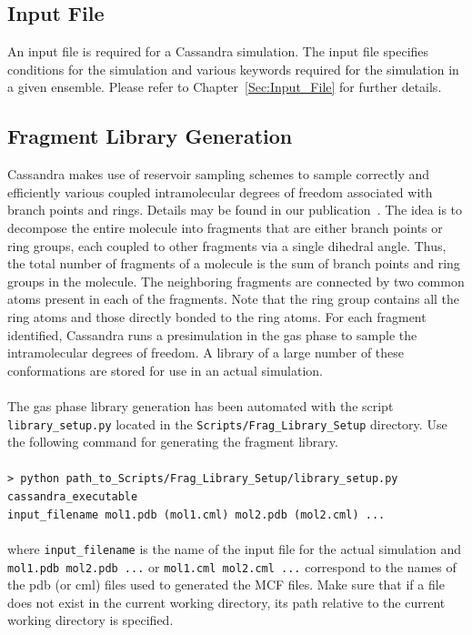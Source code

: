 \subsection{Input File}
%
%
An input file is required for a Cassandra simulation. The input file
specifies conditions for the simulation and various keywords required
for the simulation in a given ensemble. Please refer to 
Chapter~\ref{Sec:Input_File}  for further details.
%
\subsection{Fragment Library Generation}
Cassandra makes use of reservoir sampling schemes to sample correctly and efficiently various coupled intramolecular degrees of freedom associated with
branch points and rings. Details may be found in our
publication~\cite{Shah:2011}. The idea is to decompose the entire
molecule into fragments that are either branch points or ring groups,
each coupled to other fragments via a single dihedral angle. Thus, the
total number of fragments of a molecule is the sum of branch points
and ring groups in the molecule. The neighboring fragments are
connected by two common atoms present in each of the fragments. Note
that the ring group contains all the ring atoms and those directly
bonded to the ring atoms. For each fragment identified, Cassandra runs
a pre\textendash simulation in the gas phase to sample the intramolecular degrees
of freedom. A library of a large number of these conformations are
stored for use in an actual simulation. \\ \\
%
%
The gas phase library generation has been automated with the script \texttt{library\_setup.py} located in the \texttt{Scripts/Frag\_Library\_Setup}
directory. Use the following command for generating the fragment library. \\ \\
%
\texttt{> python path\_to\_Scripts/Frag\_Library\_Setup/library\_setup.py cassandra\_executable \\ input\_filename mol1.pdb (mol1.cml)  mol2.pdb (mol2.cml) ...}\\ \\
%
where \texttt{input\_filename} is the name of the input file for the actual simulation and \texttt{mol1.pdb mol2.pdb ...} or \texttt{mol1.cml mol2.cml ...} correspond to the
names of the pdb (or cml) files used to generated the MCF files. Make sure that if a file does not exist in the current working directory, its path relative
to the current working directory is specified. 

